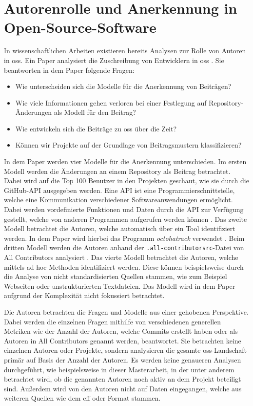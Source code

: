 \section{Autorenrolle und Anerkennung in Open-Source-Software}
\label{sec:autorenrolle-oss}
In wissenschaftlichen Arbeiten existieren bereits Analysen zur Rolle von Autoren in \gls{oss}.
Ein Paper analysiert die Zuschreibung von Entwicklern in \gls{oss} \autocite{young_which_2021}.
Sie beantworten in dem Paper folgende Fragen:

\begin{itemize}
  \item Wie unterscheiden sich die Modelle für die Anerkennung von Beiträgen?
  \item Wie viele Informationen gehen verloren bei einer Festlegung auf Repository-Änderungen als Modell für den Beitrag?
  \item Wie entwickeln sich die Beiträge zu \gls{oss} über die Zeit?
  \item Können wir Projekte auf der Grundlage von Beitragsmustern klassifizieren?
\end{itemize}

In dem Paper werden vier Modelle für die Anerkennung unterschieden.
Im ersten Modell werden die Änderungen an einem Repository als Beitrag betrachtet.
Dabei wird auf die Top 100 Benutzer in den Projekten geschaut, wie sie durch die GitHub-API ausgegeben werden.
Eine API ist eine Programmierschnittstelle, welche eine Kommunikation verschiedener Softwareanwendungen ermöglicht.
Dabei werden vordefinierte Funktionen und Daten durch die API zur Verfügung gestellt, welche von anderen Programmen aufgerufen werden können \autocite{github_about_2022}.
Das zweite Modell betrachtet die Autoren, welche automatisch über ein Tool identifiziert werden.
In dem Paper wird hierbei das Programm \emph{octohatrack} verwendet \autocites{young_which_2021}{mclaughlin_octohatrack_2020}.
Beim dritten Modell werden die Autoren anhand der \texttt{.all-contributorsrc}-Datei von \glqq All Contributors\grqq{} analysiert \autocites{young_which_2021}{bolam_recognize_2024}.
Das vierte Modell betrachtet die Autoren, welche mittels ad hoc Methoden identifiziert werden.
Diese können beispielsweise durch die Analyse von nicht standardisierten Quellen stammen, wie zum Beispiel Webseiten oder unstrukturierten Textdateien.
Das Modell wird in dem Paper aufgrund der Komplexität nicht fokussiert betrachtet.

Die Autoren betrachten die Fragen und Modelle aus einer gehobenen Perspektive.
Dabei werden die einzelnen Fragen mithilfe von verschiedenen generellen Metriken wie der Anzahl der Autoren, welche Commits erstellt haben oder als Autoren in \glqq All Contributors\grqq{} genannt werden, beantwortet.
Sie betrachten keine einzelnen Autoren oder Projekte, sondern analysieren die gesamte \gls{oss}-Landschaft primär auf Basis der Anzahl der Autoren.
Es werden keine genaueren Analysen durchgeführt, wie beispielsweise in dieser Masterarbeit, in der unter anderem betrachtet wird, ob die genannten Autoren noch aktiv an dem Projekt beteiligt sind.
Außerdem wird von den Autoren nicht auf Daten eingegangen, welche aus weiteren Quellen wie dem \gls{cff} oder  Format stammen.
